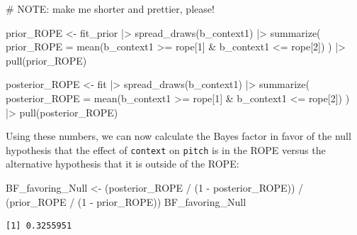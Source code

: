 \documentclass[
  doc,
  floatsintext,
  longtable,
  nolmodern,
  notxfonts,
  notimes,
  colorlinks=true,linkcolor=blue,citecolor=blue,urlcolor=blue]{apa7}
\newenvironment{Shaded}{\begin{snugshade}}{\end{snugshade}}
\newcommand{\AlertTok}[1]{\textcolor[rgb]{0.68,0.00,0.00}{#1}}
\newcommand{\AttributeTok}[1]{\textcolor[rgb]{0.40,0.45,0.13}{#1}}
\newcommand{\CommentTok}[1]{\textcolor[rgb]{0.37,0.37,0.37}{#1}}
\newcommand{\DecValTok}[1]{\textcolor[rgb]{0.68,0.00,0.00}{#1}}
\newcommand{\FunctionTok}[1]{\textcolor[rgb]{0.28,0.35,0.67}{#1}}
\newcommand{\NormalTok}[1]{\textcolor[rgb]{0.00,0.23,0.31}{#1}}
\newcommand{\OtherTok}[1]{\textcolor[rgb]{0.00,0.23,0.31}{#1}}
\newcommand{\SpecialCharTok}[1]{\textcolor[rgb]{0.37,0.37,0.37}{#1}}
\begin{document}
\begin{Shaded}
\begin{Highlighting}[]
\CommentTok{\# }\AlertTok{NOTE}\CommentTok{: make me shorter and prettier, please!}

\NormalTok{prior\_ROPE }\OtherTok{\textless{}{-}}\NormalTok{ fit\_prior }\SpecialCharTok{|\textgreater{}} 
  \FunctionTok{spread\_draws}\NormalTok{(b\_context1) }\SpecialCharTok{|\textgreater{}} 
  \FunctionTok{summarize}\NormalTok{(}
    \AttributeTok{prior\_ROPE =} \FunctionTok{mean}\NormalTok{(b\_context1 }\SpecialCharTok{\textgreater{}=}\NormalTok{ rope[}\DecValTok{1}\NormalTok{] }\SpecialCharTok{\&}\NormalTok{ b\_context1 }\SpecialCharTok{\textless{}=}\NormalTok{ rope[}\DecValTok{2}\NormalTok{])}
\NormalTok{  ) }\SpecialCharTok{|\textgreater{}}
  \FunctionTok{pull}\NormalTok{(prior\_ROPE)}

\NormalTok{posterior\_ROPE }\OtherTok{\textless{}{-}}\NormalTok{ fit }\SpecialCharTok{|\textgreater{}} 
  \FunctionTok{spread\_draws}\NormalTok{(b\_context1) }\SpecialCharTok{|\textgreater{}} 
  \FunctionTok{summarize}\NormalTok{(}
    \AttributeTok{posterior\_ROPE =} \FunctionTok{mean}\NormalTok{(b\_context1 }\SpecialCharTok{\textgreater{}=}\NormalTok{ rope[}\DecValTok{1}\NormalTok{] }\SpecialCharTok{\&}\NormalTok{ b\_context1 }\SpecialCharTok{\textless{}=}\NormalTok{ rope[}\DecValTok{2}\NormalTok{])}
\NormalTok{  ) }\SpecialCharTok{|\textgreater{}} 
  \FunctionTok{pull}\NormalTok{(posterior\_ROPE)}
\end{Highlighting}
\end{Shaded}

Using these numbers, we can now calculate the Bayes factor in favor of
the null hypothesis that the effect of \texttt{context} on
\texttt{pitch} is in the ROPE versus the alternative hypothesis that it
is outside of the ROPE:

\begin{Shaded}
\begin{Highlighting}[]
\NormalTok{BF\_favoring\_Null }\OtherTok{\textless{}{-}}\NormalTok{ (posterior\_ROPE }\SpecialCharTok{/}\NormalTok{ (}\DecValTok{1} \SpecialCharTok{{-}}\NormalTok{ posterior\_ROPE)) }\SpecialCharTok{/}
\NormalTok{                    (prior\_ROPE }\SpecialCharTok{/}\NormalTok{ (}\DecValTok{1} \SpecialCharTok{{-}}\NormalTok{ prior\_ROPE))}
\NormalTok{BF\_favoring\_Null}
\end{Highlighting}
\end{Shaded}

\begin{verbatim}
[1] 0.3255951
\end{verbatim}
\end{document}

